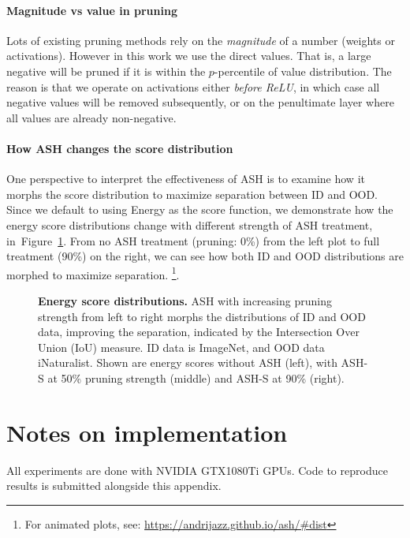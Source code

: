 \documentclass{article}
\newcommand{\figlabel}[1]{\label{fig:#1}}
\newcommand{\figref}[1]{Figure~\ref{fig:#1}}
\newcommand{\seclabel}[1]{\label{sec:#1}}
\begin{document}
\paragraph{Magnitude vs value in pruning} Lots of existing pruning methods rely on the \emph{magnitude} of a number (weights or activations). However in this work we use the direct values. That is, a large negative will be pruned if it is within the $p$-percentile of value distribution. The reason is that we operate on activations either \emph{before ReLU}, in which case all negative values will be removed subsequently, or on the penultimate layer where all values are already non-negative.




\paragraph{How ASH changes the score distribution}
One perspective to interpret the effectiveness of ASH is to examine how it morphs the score distribution to maximize separation between ID and OOD. Since we default to using Energy as the score function, we demonstrate how the energy score distributions change with different strength of ASH treatment, in~\figref{distributions}. From no ASH treatment (pruning: 0\%) from the left plot to full treatment (90\%) on the right, we can see how both ID and OOD distributions are morphed to maximize separation.
\footnote{For animated plots, see: \url{https://andrijazz.github.io/ash/\#dist}}.


\begin{figure}[hbt!]
    \caption{\textbf{Energy score distributions.} ASH with increasing pruning strength from left to right morphs the distributions of ID and OOD data, improving the separation, indicated by the Intersection Over Union (IoU) measure. ID data is ImageNet, and OOD data iNaturalist. Shown are energy scores without ASH (left), with ASH-S at 50\% pruning strength (middle) and ASH-S at 90\% (right).}
    \figlabel{distributions}
\end{figure}





\section{Notes on implementation}
\seclabel{impl-notes}
All experiments are done with NVIDIA GTX1080Ti GPUs. Code to reproduce results is submitted alongside this appendix.
\end{document}
